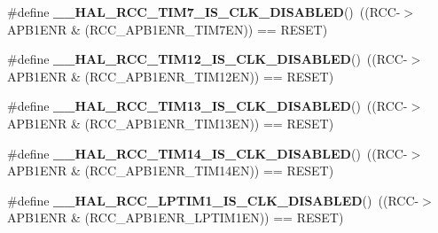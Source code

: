 \begin{DoxyCompactItemize}
\mbox{\label{group___r_c_c_ex___peripheral___clock___enable___disable___status_gac230813514cd9ee769f8f46b83d83f23}} 
\#define {\bfseries \+\_\+\+\_\+\+H\+A\+L\+\_\+\+R\+C\+C\+\_\+\+T\+I\+M7\+\_\+\+I\+S\+\_\+\+C\+L\+K\+\_\+\+D\+I\+S\+A\+B\+L\+ED}()~((R\+CC-\/$>$A\+P\+B1\+E\+NR \& (R\+C\+C\+\_\+\+A\+P\+B1\+E\+N\+R\+\_\+\+T\+I\+M7\+EN)) == R\+E\+S\+ET)
\item 
\mbox{\label{group___r_c_c_ex___peripheral___clock___enable___disable___status_ga211c8274b7043802f9c746ac4f18e0fd}} 
\#define {\bfseries \+\_\+\+\_\+\+H\+A\+L\+\_\+\+R\+C\+C\+\_\+\+T\+I\+M12\+\_\+\+I\+S\+\_\+\+C\+L\+K\+\_\+\+D\+I\+S\+A\+B\+L\+ED}()~((R\+CC-\/$>$A\+P\+B1\+E\+NR \& (R\+C\+C\+\_\+\+A\+P\+B1\+E\+N\+R\+\_\+\+T\+I\+M12\+EN)) == R\+E\+S\+ET)
\item 
\mbox{\label{group___r_c_c_ex___peripheral___clock___enable___disable___status_ga3b40e8e614be95d4a667a3f924ac1bb7}} 
\#define {\bfseries \+\_\+\+\_\+\+H\+A\+L\+\_\+\+R\+C\+C\+\_\+\+T\+I\+M13\+\_\+\+I\+S\+\_\+\+C\+L\+K\+\_\+\+D\+I\+S\+A\+B\+L\+ED}()~((R\+CC-\/$>$A\+P\+B1\+E\+NR \& (R\+C\+C\+\_\+\+A\+P\+B1\+E\+N\+R\+\_\+\+T\+I\+M13\+EN)) == R\+E\+S\+ET)
\item 
\mbox{\label{group___r_c_c_ex___peripheral___clock___enable___disable___status_ga89072bbdf8efacb3d243c50711f60766}} 
\#define {\bfseries \+\_\+\+\_\+\+H\+A\+L\+\_\+\+R\+C\+C\+\_\+\+T\+I\+M14\+\_\+\+I\+S\+\_\+\+C\+L\+K\+\_\+\+D\+I\+S\+A\+B\+L\+ED}()~((R\+CC-\/$>$A\+P\+B1\+E\+NR \& (R\+C\+C\+\_\+\+A\+P\+B1\+E\+N\+R\+\_\+\+T\+I\+M14\+EN)) == R\+E\+S\+ET)
\item 
\mbox{\label{group___r_c_c_ex___peripheral___clock___enable___disable___status_ga82602c2897dd670f007aea02f3a36dc8}} 
\#define {\bfseries \+\_\+\+\_\+\+H\+A\+L\+\_\+\+R\+C\+C\+\_\+\+L\+P\+T\+I\+M1\+\_\+\+I\+S\+\_\+\+C\+L\+K\+\_\+\+D\+I\+S\+A\+B\+L\+ED}()~((R\+CC-\/$>$A\+P\+B1\+E\+NR \& (R\+C\+C\+\_\+\+A\+P\+B1\+E\+N\+R\+\_\+\+L\+P\+T\+I\+M1\+EN)) == R\+E\+S\+ET)
\item 
\mbox{\label{group___r_c_c_ex___peripheral___clock___enable___disable___status_gaab213cf8807d6e7e8b3867ffb404d763}} 

\end{DoxyCompactItemize}
